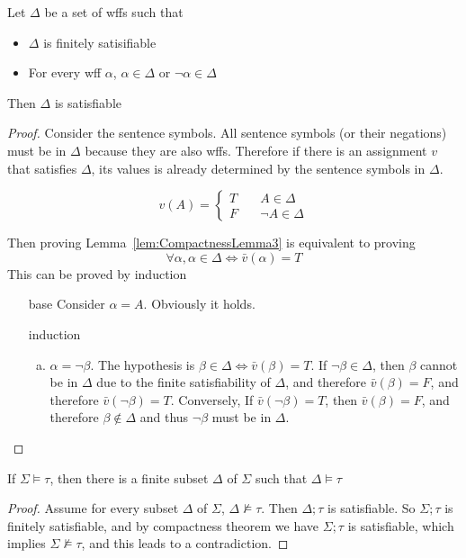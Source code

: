 \begin{lemma}
    \label{lem:CompactnessLemma3}
    Let $\Delta$ be a set of wffs such that
    \begin{itemize}
        \item $\Delta$ is finitely satisifiable
        \item For every wff $\alpha$, $\alpha\in\Delta$ or $\neg\alpha\in\Delta$
    \end{itemize}
    Then $\Delta$ is satisfiable
\end{lemma}
\begin{proof}
    Consider the sentence symbols. All sentence symbols (or their negations) must be in $\Delta$ because they are also wffs. Therefore if there is an assignment $v$ that satisfies $\Delta$, its values is already determined by the sentence symbols in $\Delta$.

    \[v(A)=\begin{cases}
        T &\quad A\in\Delta\\
        F &\quad \neg A\in\Delta
    \end{cases}\]

    Then proving Lemma~\ref{lem:CompactnessLemma3} is equivalent to proving
    \[ \forall \alpha, \alpha\in\Delta\Leftrightarrow\bar{v}(\alpha) = T \]
    This can be proved by induction
    \begin{itemize}
        \item[base] Consider $\alpha=A$. Obviously it holds.
        \item[induction] \begin{enumerate}[(a)]
            \item $\alpha=\neg\beta$. The hypothesis is $\beta\in\Delta \Leftrightarrow \bar{v}(\beta)=T$. If $\neg\beta\in\Delta$, then $\beta$ cannot be in $\Delta$ due to the finite satisfiability of $\Delta$, and therefore $\bar{v}(\beta) = F$, and therefore $\bar{v}(\neg\beta) = T$. Conversely, If $\bar{v}(\neg\beta) = T$, then $\bar{v}(\beta) =F$, and therefore $\beta\notin\Delta$ and thus $\neg\beta$ must be in $\Delta$.
        \end{enumerate}
    \end{itemize}
\end{proof}

\begin{corollary}
    \label{coroll:CorollaryOfTheCompactnessTheorem}
    If $\Sigma\vDash\tau$, then there is a finite subset $\Delta$ of $\Sigma$ such that $\Delta\vDash\tau$
\end{corollary}
\begin{proof}
    Assume for every subset $\Delta$ of $\Sigma$, $\Delta \nvDash \tau$. Then $\Delta;\tau$ is satisfiable. So $\Sigma;\tau$ is finitely satisfiable, and by compactness theorem we have $\Sigma;\tau$ is satisfiable, which implies $\Sigma\nvDash\tau$, and this leads to a contradiction.
\end{proof}

